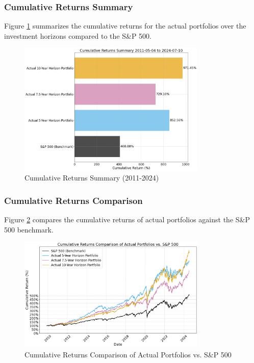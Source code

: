 \subsubsection{Cumulative Returns Summary}
Figure \ref{fig:cumulative_returns_summary} summarizes the cumulative returns for the actual portfolios over the investment horizons compared to the S\&P 500.

\begin{figure}[!htbp]
    \centering
    \includegraphics[width=0.8\textwidth]{../Figures/cumulative_returns_summary.png}
    \caption{Cumulative Returns Summary (2011-2024)}
    \label{fig:cumulative_returns_summary}
\end{figure}

\subsubsection{Cumulative Returns Comparison}
Figure \ref{fig:cumulative_returns_comparison} compares the cumulative returns of actual portfolios against the S\&P 500 benchmark.

\begin{figure}[!htbp]
    \centering
    \includegraphics[width=0.8\textwidth]{../Figures/cumulative_returns_comparison.png}
    \caption{Cumulative Returns Comparison of Actual Portfolios vs. S\&P 500}
    \label{fig:cumulative_returns_comparison}
\end{figure}


